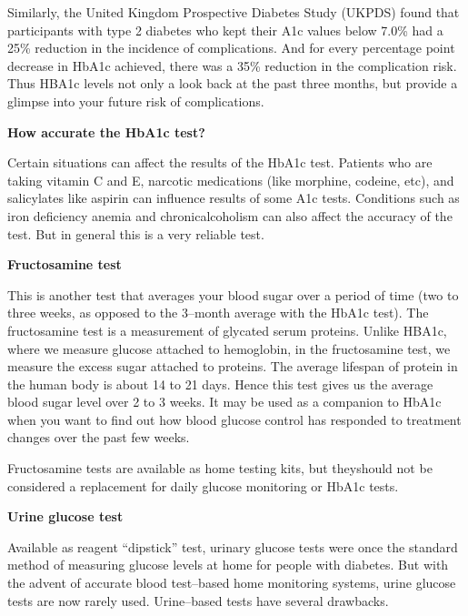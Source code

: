 Similarly, the United Kingdom Prospective Diabetes Study (UKPDS) found that participants with type 2 diabetes who kept their A1c values below 7.0\% had a 25\% reduction in the incidence of complications. And for every percentage point decrease in HbA1c achieved, there was a 35\% reduction in the complication risk. Thus HBA1c levels not only a look back at the past three months, but provide a glimpse into your future risk of complications.

\vskip 3pt

\noindent\textbf{How accurate the HbA1c test?}

Certain situations can affect the results of the HbA1c test. Patients who are taking vitamin C and E, narcotic medications (like morphine, codeine, etc), and salicylates like aspirin can influence results of some A1c tests. Conditions such as iron deficiency anemia and chronic\break alcoholism can also affect the accuracy of the test. But in general this is a very reliable test.

\vskip 3pt

\noindent\textbf{Fructosamine test}

This is another test that averages your blood sugar over a period of time (two to three weeks, as opposed to the 3–month average with the HbA1c test). The fructosamine test is a measurement of glycated serum proteins. Unlike HBA1c, where we measure glucose attached to hemoglobin, in the fructosamine test, we measure the excess sugar attached to proteins. The average lifespan of protein in the human body is about 14 to 21 days. Hence this test gives us the average blood sugar level over 2 to 3 weeks. It may be used as a companion to HbA1c when you want to find out how blood glucose control has responded to treatment changes over the past few weeks.

\clearpage

Fructosamine tests are available as home testing kits, but they\break should not be considered a replacement for daily glucose monitoring or HbA1c tests.

\noindent\textbf{Urine glucose test}

Available as reagent “dipstick” test, urinary glucose tests were once the standard method of measuring glucose levels at home for people with diabetes. But with the advent of accurate blood test–based home monitoring systems, urine glucose tests are now rarely used. Urine–based tests have several drawbacks.

